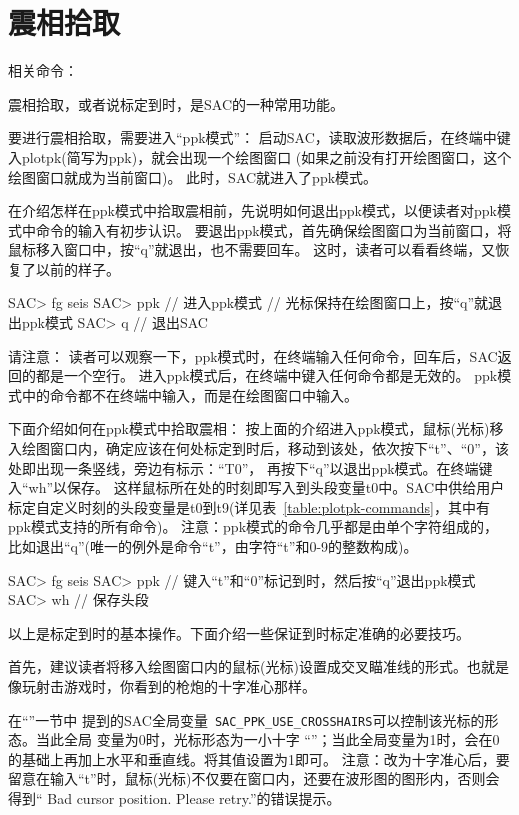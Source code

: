 \section{震相拾取}
\label{sec:phase-picking}
相关命令：

震相拾取，或者说标定到时，是SAC的一种常用功能。

要进行震相拾取，需要进入``ppk模式''：
启动SAC，读取波形数据后，在终端中键入plotpk(简写为ppk)，就会出现一个绘图窗口
(如果之前没有打开绘图窗口，这个绘图窗口就成为当前窗口)。
此时，SAC就进入了ppk模式。

在介绍怎样在ppk模式中拾取震相前，先说明如何退出ppk模式，以便读者对ppk模式中命令的输入有初步认识。
要退出ppk模式，首先确保绘图窗口为当前窗口，将鼠标移入窗口中，按``q''就退出，也不需要回车。
这时，读者可以看看终端，又恢复了以前的样子。

\begin{SACCode}
SAC> fg seis
SAC> ppk        // 进入ppk模式
// 光标保持在绘图窗口上，按``q''就退出ppk模式
SAC> q          // 退出SAC
\end{SACCode}

请注意：
读者可以观察一下，ppk模式时，在终端输入任何命令，回车后，SAC返回的都是一个空行。
进入ppk模式后，在终端中键入任何命令都是无效的。
ppk模式中的命令都不在终端中输入，而是在绘图窗口中输入。

下面介绍如何在ppk模式中拾取震相：
按上面的介绍进入ppk模式，鼠标(光标)移入绘图窗口内，确定应该在何处标定到时后，移动到该处，依次按下``t''、``0''，该处即出现一条竖线，旁边有标示：``T0''，
再按下``q''以退出ppk模式。在终端键入``wh''以保存。
这样鼠标所在处的时刻即写入到头段变量t0中。SAC中供给用户标定自定义时刻的头段变量是t0到t9(详见表~\ref{table:plotpk-commands}，其中有ppk模式支持的所有命令)。
注意：ppk模式的命令几乎都是由单个字符组成的，比如退出``q''(唯一的例外是命令``t''，由字符``t''和0-9的整数构成)。

\begin{SACCode}
SAC> fg seis
SAC> ppk
// 键入``t''和``0''标记到时，然后按``q''退出ppk模式
SAC> wh         // 保存头段
\end{SACCode}
以上是标定到时的基本操作。下面介绍一些保证到时标定准确的必要技巧。

首先，建议读者将移入绘图窗口内的鼠标(光标)设置成交叉瞄准线的形式。也就是像玩射击游戏时，你看到的枪炮的十字准心那样。

在``''一节中
提到的SAC全局变量~\verb+SAC_PPK_USE_CROSSHAIRS+可以控制该光标的形态。当此全局
变量为0时，光标形态为一小十字
``''；当此全局变量为1时，会在0的基础上再加上水平和垂直线。将其值设置为1即可。
注意：改为十字准心后，要留意在输入``t''时，鼠标(光标)不仅要在窗口内，还要在波形图的图形内，否则会得到`` Bad cursor position. Please retry.''的错误提示。


